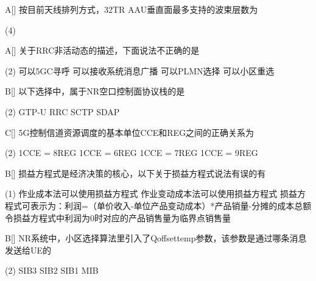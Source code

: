 \begin{choice}{A}[]
    按目前天线排列方式，32TR AAU垂直面最多支持的波束层数为
    \begin{tasks}(4)
    \end{tasks}
\end{choice}


\begin{choice}{A}[]
    关于RRC非活动态的描述，下面说法不正确的是
    \begin{tasks}(2)
        \task 可以5GC寻呼
        \task 可以接收系统消息广播
        \task 可以PLMN选择
        \task 可以小区重选
    \end{tasks}
\end{choice}


\begin{choice}{B}[]
    以下选择中，属于NR空口控制面协议栈的是
    \begin{tasks}(2)
        \task GTP-U
        \task RRC
        \task SCTP
        \task SDAP
    \end{tasks}
\end{choice}


\begin{choice}{C}[]
    5G控制信道资源调度的基本单位CCE和REG之间的正确关系为
    \begin{tasks}(2)
        \task 1CCE = 8REG
        \task 1CCE = 6REG
        \task 1CCE = 7REG
        \task 1CCE = 9REG
    \end{tasks}
\end{choice}

\begin{choice}{B}[]
    损益方程式是经济决策的核心，以下关于损益方程式说法有误的有
    \begin{tasks}(1)
        \task 作业成本法可以使用损益方程式
        \task 作业变动成本法可以使用损益方程式
        \task 损益方程式可表示为：利润=（单价收入-单位产品变动成本）*产品销量-分摊的成本总额
        \task 令损益方程式中利润为0时对应的产品销售量为临界点销售量
    \end{tasks}
\end{choice}

\begin{choice}{B}[]
    NR系统中，小区选择算法里引入了Qoffsettemp参数，该参数是通过哪条消息发送给UE的
    \begin{tasks}(2)
        \task SIB3
        \task SIB2
        \task SIB1
        \task MIB
    \end{tasks}
\end{choice}




